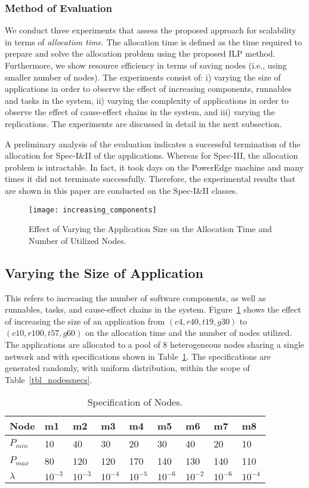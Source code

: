\subsubsection{Method of Evaluation}
We conduct three experiments that assess the proposed approach for scalability in terms of \textit{allocation time}. The allocation time is defined as the time required to prepare and solve the allocation problem using the proposed ILP method. Furthermore, we show resource efficiency in terms of saving nodes (i.e., using smaller number of nodes). The experiments consist of: i) varying the size of applications in order to observe the effect of increasing components, runnables and tasks in the system, ii) varying the complexity of applications in order to observe the effect of cause-effect chains in the system, and iii) varying the replications. The experiments are discussed in detail in the next subsection.

A preliminary analysis of the evaluation indicates a successful termination of the allocation for Spec-I\&II of the applications. Whereas for Spec-III, the allocation problem is intractable. In fact, it took days on the PowerEdge machine and many times it did not terminate successfully. Therefore, the experimental results that are shown in this paper are conducted on the Spec-I\&II classes. 
\begin{figure}[t!]
\centering
\texttt{[image: increasing\_components]}
\caption{Effect of Varying the Application Size on the Allocation Time and Number of Utilized Nodes.}
\label{fig_increasing_components}
\end{figure}

\subsection{Varying the Size of Application} 
This refers to increasing the number of software components, as well as runnables, tasks, and cause-effect chains in the system. Figure~\ref{fig_increasing_components} shows the effect of increasing the size of an application from $(c4,r40,t19,g30)$ to $(c10,r100,t57,g60)$ on the allocation time and  the number of nodes utilized. The applications are allocated to a pool of 8 heterogeneous nodes sharing a single network and with specifications shown in Table~\ref{tbl_nodesspecs_exp}. The specifications are generated randomly, with uniform distribution, within the scope of Table~\ref{tbl_nodesspecs}.
\begin{table}
\centering\small
\setlength{\tabcolsep}{4pt}
\begin{tabular}{@{}lllllllll@{}}
\toprule
Node  		& m1 & m2 & m3 & m4&m5&m6&m7&m8\\ 
\midrule
$P_{min}$ & 10 	& 40 	&	30 	&	20 	& 30 	& 	40	&	20&	10\\
$P_{max}$ & 80	& 120	&	120	&	170	&	140	&	130	&	140 &110\\
$\lambda$  &$10^{-3}$	&$10^{-3}$	&$10^{-4}$&$10^{-5}$&$10^{-6}$&$10^{-2}$&$10^{-6}$&$10^{-4}$\\
\bottomrule
\end{tabular}
\caption{Specification of Nodes.}
\label{tbl_nodesspecs_exp}\vspace{-0.4cm}
\end{table}

